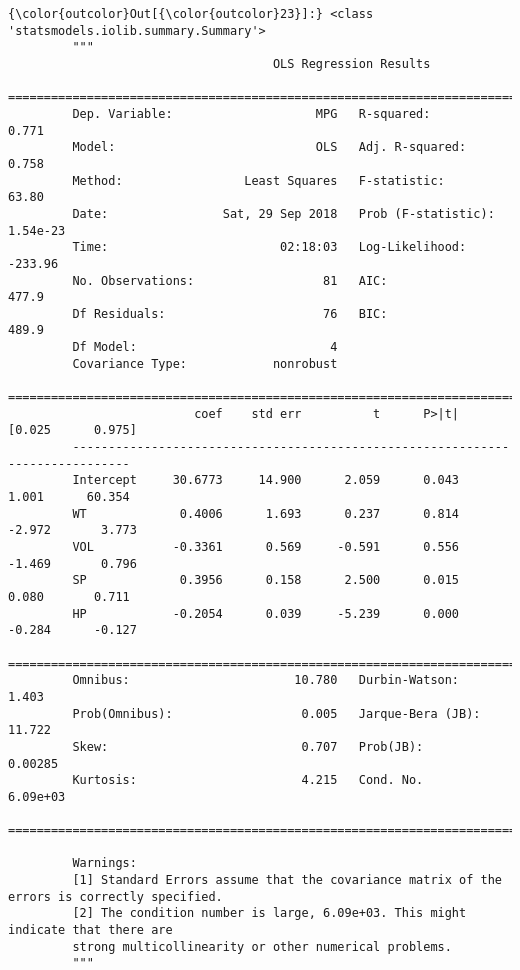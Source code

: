 \documentclass[11pt]{article}
\begin{document}
\begin{Verbatim}[commandchars=\\\{\}]
{\color{outcolor}Out[{\color{outcolor}23}]:} <class 'statsmodels.iolib.summary.Summary'>
         """
                                     OLS Regression Results                            
         ==============================================================================
         Dep. Variable:                    MPG   R-squared:                       0.771
         Model:                            OLS   Adj. R-squared:                  0.758
         Method:                 Least Squares   F-statistic:                     63.80
         Date:                Sat, 29 Sep 2018   Prob (F-statistic):           1.54e-23
         Time:                        02:18:03   Log-Likelihood:                -233.96
         No. Observations:                  81   AIC:                             477.9
         Df Residuals:                      76   BIC:                             489.9
         Df Model:                           4                                         
         Covariance Type:            nonrobust                                         
         ==============================================================================
                          coef    std err          t      P>|t|      [0.025      0.975]
         ------------------------------------------------------------------------------
         Intercept     30.6773     14.900      2.059      0.043       1.001      60.354
         WT             0.4006      1.693      0.237      0.814      -2.972       3.773
         VOL           -0.3361      0.569     -0.591      0.556      -1.469       0.796
         SP             0.3956      0.158      2.500      0.015       0.080       0.711
         HP            -0.2054      0.039     -5.239      0.000      -0.284      -0.127
         ==============================================================================
         Omnibus:                       10.780   Durbin-Watson:                   1.403
         Prob(Omnibus):                  0.005   Jarque-Bera (JB):               11.722
         Skew:                           0.707   Prob(JB):                      0.00285
         Kurtosis:                       4.215   Cond. No.                     6.09e+03
         ==============================================================================
         
         Warnings:
         [1] Standard Errors assume that the covariance matrix of the errors is correctly specified.
         [2] The condition number is large, 6.09e+03. This might indicate that there are
         strong multicollinearity or other numerical problems.
         """
\end{Verbatim}
            
\end{document}

